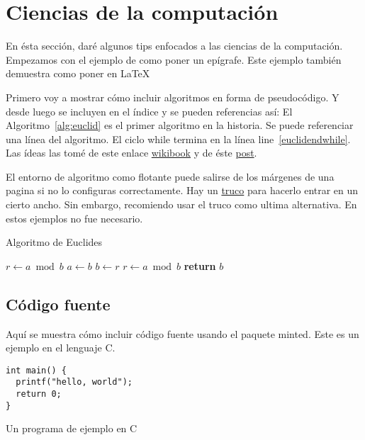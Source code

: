 \section{Ciencias de la computación}
\label{sec:cs}

En ésta sección, daré algunos tips enfocados a las ciencias de la computación.
Empezamos con el ejemplo de como poner un epígrafe.
Este ejemplo también demuestra como poner  en \LaTeX{}

Primero voy a mostrar cómo incluir algoritmos en forma de pseudocódigo.
Y desde luego se incluyen en el índice y se pueden referencias así: 
El Algoritmo~\ref{alg:euclid} es el primer algoritmo en la historia.
Se puede referenciar una línea del algoritmo.
El ciclo while termina en la línea line~\ref{euclidendwhile}.
Las ídeas las tomé de este enlace \href{https://en.wikibooks.org/wiki/LaTeX/Algorithms#Typesetting_using_the_algorithmicx_package}{wikibook} y de éste \href{https://tex.stackexchange.com/questions/229355/algorithm-algorithmic-algorithmicx-algorithm2e-algpseudocode-confused}{post}.

El entorno de algoritmo como flotante puede salirse de los márgenes de una pagina si no lo configuras correctamente.
Hay un \href{https://tex.stackexchange.com/questions/350434/adjust-width-of-algorithm-float}{truco} para hacerlo entrar en un cierto ancho.
Sin embargo, recomiendo usar el truco como ultima alternativa.
En estos ejemplos no fue necesario.

\begin{algorithm}[H]
\caption{Algoritmo de Euclides}
\label{alg:euclid}
\begin{algorithmic}[1] %
     
    \State $r\gets a \bmod b$
     
        \State $a \gets b$
        \State $b \gets r$
        \State $r \gets a \bmod b$
    \EndWhile\label{euclidendwhile}
    \State \textbf{return} $b$
    \EndProcedure
\end{algorithmic}
\end{algorithm}


\subsection{Código fuente}
Aquí se muestra cómo incluir código fuente usando el paquete minted.
Este es un ejemplo en el lenguaje C.
\begin{listing}
\begin{verbatim}
int main() {
  printf("hello, world");
  return 0;
}
\end{verbatim}
\caption{Un programa de ejemplo en C}\label{lst:hello}
\end{listing}

